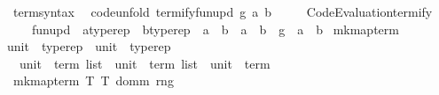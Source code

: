 \begin{isabellebody}
\isanewline
{}\isamarkupfalse%
\isanewline
\ \ \ term{\isacharunderscore}{\kern0pt}syntax\isanewline
{}\isanewline
\isanewline
{}\isamarkupfalse%
\isanewline
\ \ {\isacharbrackleft}{\kern0pt}code{\isacharunderscore}{\kern0pt}unfold{\isacharbrackright}{\kern0pt}{\isacharcolon}{\kern0pt}\ {\isachardoublequoteopen}termify{\isacharunderscore}{\kern0pt}fun{\isacharunderscore}{\kern0pt}upd\ g\ a\ b\ {\isacharequal}{\kern0pt}\isanewline
\ \ \ \ {\isacharparenleft}{\kern0pt}Code{\isacharunderscore}{\kern0pt}Evaluation{\isachardot}{\kern0pt}termify\isanewline
\ \ \ \ \ \ {\isacharparenleft}{\kern0pt}fun{\isacharunderscore}{\kern0pt}upd\ {\isacharcolon}{\kern0pt}{\isacharcolon}{\kern0pt}\ {\isacharparenleft}{\kern0pt}{\isacharprime}{\kern0pt}a{\isacharcolon}{\kern0pt}{\isacharcolon}{\kern0pt}typerep\ {\isasymRightarrow}\ {\isacharprime}{\kern0pt}b{\isacharcolon}{\kern0pt}{\isacharcolon}{\kern0pt}typerep{\isacharparenright}{\kern0pt}\ {\isasymRightarrow}\ {\isacharprime}{\kern0pt}a\ {\isasymRightarrow}\ {\isacharprime}{\kern0pt}b\ {\isasymRightarrow}\ {\isacharprime}{\kern0pt}a\ {\isasymRightarrow}\ {\isacharprime}{\kern0pt}b{\isacharparenright}{\kern0pt}\ {\isacharless}{\kern0pt}{\isasymcdot}{\isachargreater}{\kern0pt}\ g\ {\isacharless}{\kern0pt}{\isasymcdot}{\isachargreater}{\kern0pt}\ a\ {\isacharless}{\kern0pt}{\isasymcdot}{\isachargreater}{\kern0pt}\ b{\isacharparenright}{\kern0pt}{\isachardoublequoteclose}\isanewline
\isanewline
{}\isamarkupfalse%
\isanewline
\isanewline
{}\isamarkupfalse%
\ mk{\isacharunderscore}{\kern0pt}map{\isacharunderscore}{\kern0pt}term\ {\isacharcolon}{\kern0pt}{\isacharcolon}{\kern0pt}\isanewline
\ \ {\isachardoublequoteopen}{\isacharparenleft}{\kern0pt}unit\ {\isasymRightarrow}\ typerep{\isacharparenright}{\kern0pt}\ {\isasymRightarrow}\ {\isacharparenleft}{\kern0pt}unit\ {\isasymRightarrow}\ typerep{\isacharparenright}{\kern0pt}\ {\isasymRightarrow}\isanewline
\ \ \ \ {\isacharparenleft}{\kern0pt}unit\ {\isasymRightarrow}\ term\ list{\isacharparenright}{\kern0pt}\ {\isasymRightarrow}\ {\isacharparenleft}{\kern0pt}unit\ {\isasymRightarrow}\ term\ list{\isacharparenright}{\kern0pt}\ {\isasymRightarrow}\ unit\ {\isasymRightarrow}\ term{\isachardoublequoteclose}\isanewline
\ \ \ {\isachardoublequoteopen}mk{\isacharunderscore}{\kern0pt}map{\isacharunderscore}{\kern0pt}term\ T{}\ T{}\ domm\ rng\ {\isacharequal}{\kern0pt}\isanewline
\ \ \ \ {\isacharparenleft}{\kern0pt}{\isasymlambda}{\isacharunderscore}{\kern0pt}{\isachardot}{\kern0pt}\isanewline

\end{isabellebody}
